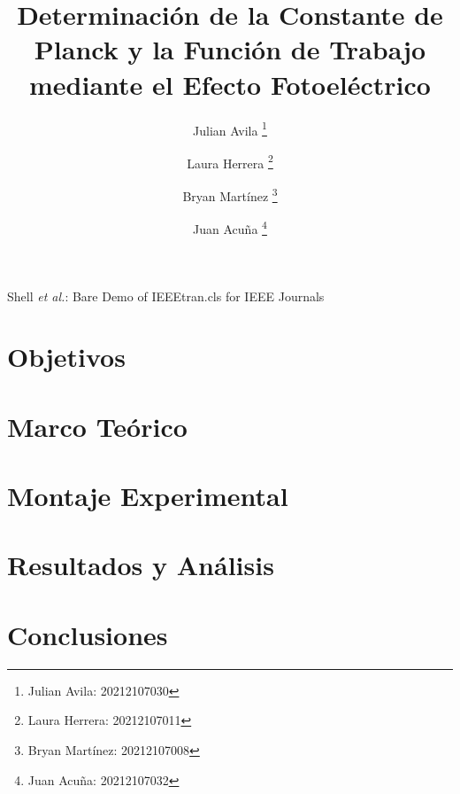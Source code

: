\documentclass[journal, table]{IEEEtran}
\begin{document}
\title{Determinación de la Constante de Planck y la Función de Trabajo mediante el Efecto Fotoeléctrico}

\author[*]{Julian Avila
  \thanks{Julian Avila: 20212107030}}
\author[*]{Laura Herrera
  \thanks{Laura Herrera: 20212107011}}
\author[*]{Bryan Martínez
  \thanks{Bryan Martínez: 20212107008}}
\author[*]{Juan Acuña
  \thanks{Juan Acuña: 20212107032}}


\markboth{}
{Shell \MakeLowercase{\textit{et al.}}: Bare Demo of IEEEtran.cls for IEEE Journals}

\maketitle



\section{Objetivos}


\section{Marco Teórico}


\section{Montaje Experimental}


\section{Resultados y Análisis}


\section{Conclusiones}


\printbibliography
\end{document}
